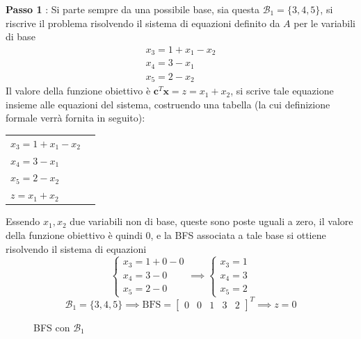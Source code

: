\documentclass[10pt, letterpaper]{report}
\begin{document}
\textbf{Passo 1} : Si parte sempre da una possibile base, sia questa $\mathcal B_1 = \{3,4,5\}$, si riscrive il problema risolvendo il sistema di equazioni definito da $A$ per le variabili di base 
\begin{eqnarray*}
    x_3=1+x_1-x_2\\ 
    x_4=3-x_1\\ 
    x_5=2-x_2
\end{eqnarray*}
Il valore della funzione obiettivo è $\mathbf c ^T \mathbf x=z=x_1+x_2$, si scrive tale equazione insieme alle equazioni del sistema, costruendo una tabella (la cui definizione formale verrà fornita in seguito):
\begin{center}
    \begin{tabular}{|l|l|}\hline 
        $x_3=1+x_1-x_2$\\ 
        $x_4=3-x_1$\\ 
        $x_5=2-x_2$ \\
        \hline 
        $z=x_1+x_2$ \\\hline 
    \end{tabular}
\end{center}
Essendo $x_1,x_2$ due variabili non di base, queste sono poste uguali a zero, il valore della funzione obiettivo è quindi 0, e la BFS associata a tale base si ottiene risolvendo il sistema di equazioni
$$\begin{cases}
    x_3=1+0-0\\ 
    x_4=3-0\\ 
    x_5=2-0
\end{cases}\implies\begin{cases}
    x_3=1\\ x_4=3\\ x_5=2
\end{cases}$$
$$ \mathcal{B}_1 = \{3,4,5\}\implies \text{BFS}=\begin{bmatrix}
    0 & 0 & 1 & 3 & 2 
\end{bmatrix}^T \implies z = 0$$
\begin{figure}[h]
    \caption{BFS con $\mathcal B_1$}
\end{figure}
\end{document}
